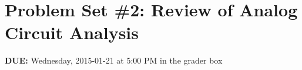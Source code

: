 


\section*{Problem Set \#2: Review of Analog Circuit Analysis}

\textbf{DUE:} Wednesday, 2015-01-21 at 5:00 PM in the grader box












